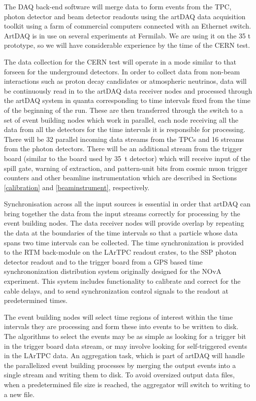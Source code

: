 The DAQ back-end software will merge data to form events from the TPC, 
photon detector and beam detector readouts using the 
artDAQ data acquisition toolkit using a farm of commercial 
computers connected with an Ethernet switch.  ArtDAQ is 
in use on several experiments at Fermilab.  We are using it
on the 35 t prototype, so we will have considerable 
experience by the time of the CERN test.  

The data collection for the CERN test will operate in a mode 
similar to that forseen for the underground detectors. In order 
to collect data from non-beam interactions such as proton decay 
candidates or atmospheric neutrinos, data will be continuously
read in to the artDAQ data receiver nodes and processed through
the artDAQ system in quanta corresponding to time intervals fixed
from the time of the beginning of the run.  These are then 
transferred through the switch to a set of event building nodes 
which work in parallel, each node receiving all the data from all 
the detectors for the time intervals it is responsible for processing.
There will be 32 parallel incoming data streams from the TPCs
and 16 streams from the photon detectors.  There will be an additional
stream from the trigger board (similar to the board used by 35~t detector) 
which will receive input of the spill 
gate, warning of extraction, and pattern-unit bits from cosmic muon trigger counters
and other beamline instrumentation which are described in Sections \ref{calibration} and
\ref{beaminstrument}, respectively.

Synchronisation across all the input sources is essential in order 
that artDAQ can bring together the data from the input streams correctly for
processing by the event building nodes.  The data receiver nodes will provide
overlap by repeating the data at the boundaries of the time intervals so 
that a particle whose data spans two time intervals can be collected.  
The time synchronization is provided to the RTM back-module on the LArTPC 
readout crates, to the SSP photon detector readout and to the trigger board from
a GPS based time synchrononization distribution system originally designed 
for the NOvA experiment.  This system includes functionality to calibrate and 
correct for the cable delays, and to send synchronization control signals to
the readout at predetermined times.

The event building nodes will select time regions of interest within the time 
intervals they are processing and form these into events to be written to 
disk. The algorithms to select the events may be as simple as looking for 
a trigger bit in the trigger board data stream, or may involve looking 
for self-triggered events in the LArTPC data.  An aggregation task, which 
is part of artDAQ will handle the parallelized event building processes by 
merging the output events into a single stream and writing them to disk.
To avoid oversized output data files, when a predetermined file size is reached, 
the aggregator will switch to writing to a new file.  

